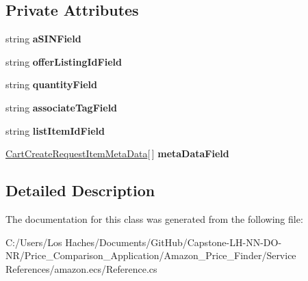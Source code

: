 \subsection*{Private Attributes}
\begin{DoxyCompactItemize}
\item 
\hypertarget{class_price___comparison_1_1amazon_1_1ecs_1_1_cart_create_request_item_a712d50fb98290f5ec9fe1004c97fad28}{string {\bfseries a\-S\-I\-N\-Field}}\label{class_price___comparison_1_1amazon_1_1ecs_1_1_cart_create_request_item_a712d50fb98290f5ec9fe1004c97fad28}

\item 
\hypertarget{class_price___comparison_1_1amazon_1_1ecs_1_1_cart_create_request_item_a30ca6bc683359e0628f5f7a08403755b}{string {\bfseries offer\-Listing\-Id\-Field}}\label{class_price___comparison_1_1amazon_1_1ecs_1_1_cart_create_request_item_a30ca6bc683359e0628f5f7a08403755b}

\item 
\hypertarget{class_price___comparison_1_1amazon_1_1ecs_1_1_cart_create_request_item_ad9bb756919285eac7258220df15a2281}{string {\bfseries quantity\-Field}}\label{class_price___comparison_1_1amazon_1_1ecs_1_1_cart_create_request_item_ad9bb756919285eac7258220df15a2281}

\item 
\hypertarget{class_price___comparison_1_1amazon_1_1ecs_1_1_cart_create_request_item_a09fe9b9476b3adec2777292fa3385702}{string {\bfseries associate\-Tag\-Field}}\label{class_price___comparison_1_1amazon_1_1ecs_1_1_cart_create_request_item_a09fe9b9476b3adec2777292fa3385702}

\item 
\hypertarget{class_price___comparison_1_1amazon_1_1ecs_1_1_cart_create_request_item_a8999e91e098e6eccf6be351e3efcdb3e}{string {\bfseries list\-Item\-Id\-Field}}\label{class_price___comparison_1_1amazon_1_1ecs_1_1_cart_create_request_item_a8999e91e098e6eccf6be351e3efcdb3e}

\item 
\hypertarget{class_price___comparison_1_1amazon_1_1ecs_1_1_cart_create_request_item_a4a9ca6cd5fca7d92e3dcf6652db18f4b}{\hyperlink{class_price___comparison_1_1amazon_1_1ecs_1_1_cart_create_request_item_meta_data}{Cart\-Create\-Request\-Item\-Meta\-Data}\mbox{[}$\,$\mbox{]} {\bfseries meta\-Data\-Field}}\label{class_price___comparison_1_1amazon_1_1ecs_1_1_cart_create_request_item_a4a9ca6cd5fca7d92e3dcf6652db18f4b}

\end{DoxyCompactItemize}


\subsection{Detailed Description}


The documentation for this class was generated from the following file\-:\begin{DoxyCompactItemize}
\item 
C\-:/\-Users/\-Los Haches/\-Documents/\-Git\-Hub/\-Capstone-\/\-L\-H-\/\-N\-N-\/\-D\-O-\/\-N\-R/\-Price\-\_\-\-Comparison\-\_\-\-Application/\-Amazon\-\_\-\-Price\-\_\-\-Finder/\-Service References/amazon.\-ecs/Reference.\-cs\end{DoxyCompactItemize}
